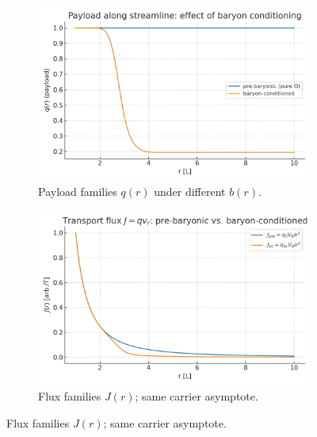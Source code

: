 \documentclass[12pt,a4paper,oneside]{scrreprt}
\begin{document}
\begin{figure}[htbp]
  \vspace{0.6em}
  \begin{subfigure}[t]{0.49\linewidth}
    \includegraphics[width=\linewidth]{payload_profiles.png}
    \caption{Payload families $q(r)$ under different $b(r)$.}
    \label{fig:carrier:payload}
  \end{subfigure}\hfill
  \begin{subfigure}[t]{0.49\linewidth}
    \includegraphics[width=\linewidth]{flux_profiles.png}
    \caption{Flux families $J(r)$; same carrier asymptote.}
    \label{fig:carrier:flux}
  \end{subfigure}
\end{figure}
\end{document}
